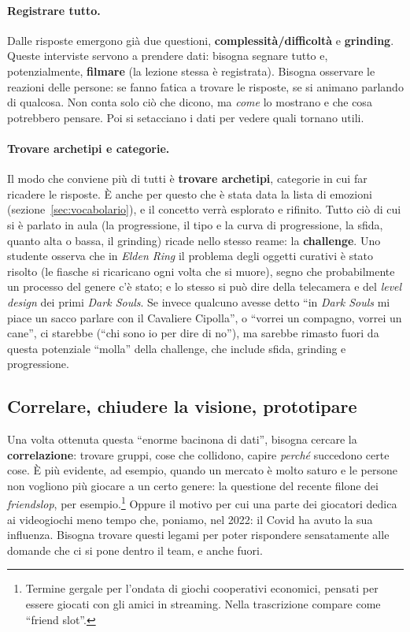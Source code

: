 \paragraph{Registrare tutto.} Dalle risposte emergono già due questioni,
\textbf{complessità/difficoltà} e \textbf{grinding}. Queste interviste servono
a prendere dati: bisogna segnare tutto e, potenzialmente, \textbf{filmare}
(la lezione stessa è registrata). Bisogna osservare le reazioni delle
persone: se fanno fatica a trovare le risposte, se si animano parlando di
qualcosa. Non conta solo ciò che dicono, ma \emph{come} lo mostrano e che
cosa potrebbero pensare. Poi si setacciano i dati per vedere quali tornano
utili.

\paragraph{Trovare archetipi e categorie.} Il modo che conviene più di tutti è
\textbf{trovare archetipi}, categorie in cui far ricadere le risposte. È anche
per questo che è stata data la lista di emozioni (sezione~\ref{sec:vocabolario}),
e il concetto verrà esplorato e rifinito. Tutto ciò di cui si è parlato in
aula (la progressione, il tipo e la curva di progressione, la sfida, quanto
alta o bassa, il grinding) ricade nello stesso reame: la \textbf{challenge}.
Uno studente osserva che in \emph{Elden Ring} il problema degli oggetti
curativi è stato risolto (le fiasche si ricaricano ogni volta che si muore),
segno che probabilmente un processo del genere c'è stato; e lo stesso si può
dire della telecamera e del \emph{level design} dei primi \emph{Dark Souls}.
Se invece qualcuno avesse detto ``in \emph{Dark Souls} mi piace un sacco
parlare con il Cavaliere Cipolla'', o ``vorrei un compagno, vorrei un
cane'', ci starebbe (``chi sono io per dire di no''), ma sarebbe rimasto fuori
da questa potenziale ``molla'' della challenge, che include sfida, grinding e
progressione.

\subsection{Correlare, chiudere la visione, prototipare}

Una volta ottenuta questa ``enorme bacinona di dati'', bisogna cercare la
\textbf{correlazione}: trovare gruppi, cose che collidono, capire \emph{perché}
succedono certe cose. È più evidente, ad esempio, quando un mercato è molto
saturo e le persone non vogliono più giocare a un certo genere: la questione
del recente filone dei \emph{friendslop}, per esempio.\footnote{Termine
gergale per l'ondata di giochi cooperativi economici, pensati per essere
giocati con gli amici in streaming. Nella trascrizione compare come
``friend slot''.} Oppure il motivo per cui una parte dei giocatori dedica ai
videogiochi meno tempo che, poniamo, nel 2022: il Covid ha avuto la sua
influenza. Bisogna trovare questi legami per poter rispondere sensatamente
alle domande che ci si pone dentro il team, e anche fuori.

